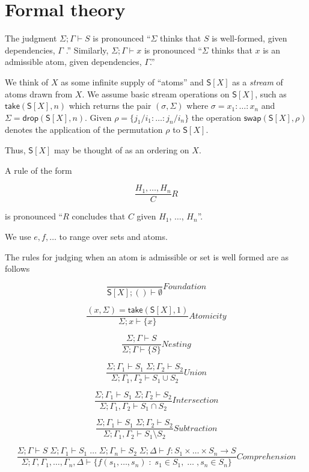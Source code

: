 \section{Formal theory}
The judgment \(\Sigma; \Gamma \vdash S\) is pronounced
``\(\Sigma\) thinks that \(S\) is well-formed, given
dependencies, \(\Gamma\) .'' Similarly,
\(\Sigma; \Gamma \vdash x\) is pronounced
``\(\Sigma\) thinks that \(x\) is an admissible atom, given
dependencies, \(\Gamma\).''

We think of $X$ as some infinite supply of ``atoms'' and
$\mathsf{S}[X]$ as a \emph{stream} of atoms drawn from $X$. We assume
basic stream operations on $\mathsf{S}[X]$, such as
$\mathsf{take}(\mathsf{S}[X],n)$ which returns the pair
$(\sigma,\Sigma)$ where $\sigma = x_{1}:\ldots:x_{n}$ and $\Sigma = \mathsf{drop}(\mathsf{S}[X],n)$. Given $\rho = \{j_{1}/i_{1}:\ldots:j_{n}/i_{n}\}$ the operation
$\mathsf{swap}(\mathsf{S}[X],\rho)$ denotes the application of the
permutation $\rho$ to $\mathsf{S}[X]$.

Thus, $\mathsf{S}[X]$ may be thought of as an ordering on $X$.

A rule of the form

\[\frac{ H_1, \ldots , H_n }{ C }R\]

is pronounced ``\(R\) concludes that \(C\) given \(H_1\), \(\ldots\),
\(H_n\)''.

We use $e,f,\ldots$ to range over sets and atoms.

The rules for judging when an atom is admissible or set is well
formed are as follows

\[\frac{ }{ \mathsf{S}[X]; () \vdash \emptyset}Foundation\]

\[\frac{ (x,\Sigma) = \mathsf{take}(\mathsf{S}[X],1)}{ \Sigma; x \vdash \{ x \}}Atomicity\]

\[\frac{ \Sigma; \Gamma \vdash S }{ \Sigma; \Gamma \vdash \{ S \}}Nesting\]

\[\frac{ \Sigma; \Gamma_1 \vdash S_1 \; \Sigma; \Gamma_2 \vdash S_2}{ \Sigma; \Gamma_1, \Gamma_2 \vdash S_1 \cup S_2}Union\]

\[\frac{ \Sigma; \Gamma_1 \vdash S_1 \; \Sigma; \Gamma_2 \vdash S_2}{ \Sigma; \Gamma_1, \Gamma_2 \vdash S_1 \cap S_2}Intersection\]

\[\frac{ \Sigma; \Gamma_1 \vdash S_1 \; \Sigma; \Gamma_2 \vdash S_2}{ \Sigma; \Gamma_1, \Gamma_2 \vdash S_1 \setminus S_2}Subtraction\]

\[\frac{ \Sigma; \Gamma \vdash S \; \Sigma; \Gamma_{1} \vdash S_{1} \;\ldots\; \Sigma; \Gamma_{n} \vdash S_{2}\; \Sigma; \Delta \vdash f : S_{1} \times \ldots \times S_{n} \to S }{ \Sigma; \Gamma,\Gamma_{1},\ldots, \Gamma_{n},\Delta \vdash \{ f(s_{1},\ldots,s_{n}) \; : \; s_1 \in S_{1},\; \ldots\;, s_{n} \in S_{n}\}}Comprehension\]

